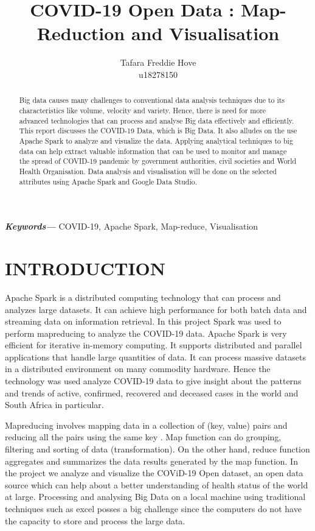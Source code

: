 \documentclass[12pt]{article}
\title{COVID-19 Open Data : Map-Reduction and Visualisation}
\author{Tafara Freddie Hove \\
        \small u18278150 \\
}
\date{}
\providecommand{\keywords}[1]
{
  \small	
  \textbf{\textit{Keywords---}} #1 
}
\begin{document}
\maketitle
\begin{abstract}


Big data  causes many challenges to conventional data analysis techniques due to its characteristics like volume, velocity and variety. Hence, there is need for more advanced technologies that can process and analyse Big data  effectively and efficiently. This report discusses the COVID-19 Data, which is Big Data. It also alludes on the use Apache Spark to analyze and visualize the data. Applying analytical techniques to big data can help extract valuable information that can be used to monitor and manage the spread of COVID-19  pandemic by government authorities, civil societies and World Health Organisation. Data analysis and visualisation will be done on the selected attributes using Apache Spark and Google Data Studio.

\end{abstract}\hspace{10pt}
\keywords{COVID-19, Apache Spark, Map-reduce, Visualisation}

\section{INTRODUCTION}

Apache Spark is a distributed computing  technology that can  process and analyzes large datasets. It can achieve high performance  for both batch data and streaming data on information retrieval. In this project Spark was used to perform mapreducing to analyze the COVID-19 data.  Apache Spark is very efficient for iterative in-memory computing. It supports distributed and parallel applications that handle large quantities of data. It can process massive datasets in a distributed environment on many commodity hardware. Hence the technology was  used analyze COVID-19 data to give insight about the patterns and trends of active, confirmed, recovered and deceased cases in the world and South Africa in particular.

 Mapreducing involves mapping  data in a collection of (key, value) pairs and reducing all the pairs using the same key \cite{Johnson et al}.  Map function can do grouping, filtering and sorting of data (transformation). On the other hand, reduce function aggregates and summarizes the data results generated by the map function. In the project we analyze and visualize the COViD-19 Open dataset, an open data source which can help about a better understanding of health status of the world at large. Processing and analysing Big Data on a local machine using traditional techniques such as excel posses a big challenge since the computers do not have the capacity to store and process the large data.
 
\end{document}
